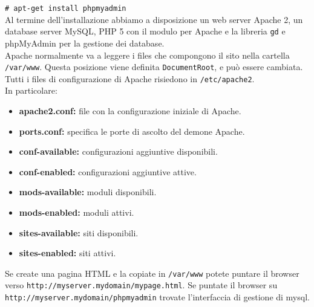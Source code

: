 \documentclass[a4paper]{report}
\newcommand\tab[1][1cm]{\hspace*{#1}}
\begin{document}
\tab\texttt{\# apt-get install phpmyadmin}\\
Al termine dell'installazione abbiamo a disposizione un web server Apache 2, un database server MySQL, PHP 5 con il modulo per Apache e la libreria \texttt{gd} e phpMyAdmin per la gestione dei database.\\
Apache normalmente va a leggere i files che compongono il sito nella cartella \texttt{/var/www}. Questa posizione viene definita \texttt{DocumentRoot}, e può essere cambiata. Tutti i files di configurazione di Apache risiedono in \texttt{/etc/apache2}.\\
In particolare:
\begin{itemize}
\item \textbf{apache2.conf:} file con la configurazione iniziale di Apache.
\item \textbf{ports.conf:} specifica le porte di ascolto del demone Apache.
\item \textbf{conf-available:} configurazioni aggiuntive disponibili.
\item \textbf{conf-enabled:} configurazioni aggiuntive attive.
\item \textbf{mods-available:} moduli disponibili.
\item \textbf{mods-enabled:} moduli attivi.
\item \textbf{sites-available:} siti disponibili.
\item \textbf{sites-enabled:} siti attivi.
\end{itemize}
Se create una pagina HTML e la copiate in \texttt{/var/www} potete puntare il browser verso \texttt{http://myserver.mydomain/mypage.html}. Se puntate il browser su \texttt{http://myserver.mydomain/phpmyadmin} trovate l'interfaccia di gestione di mysql.\\
\end{document}
